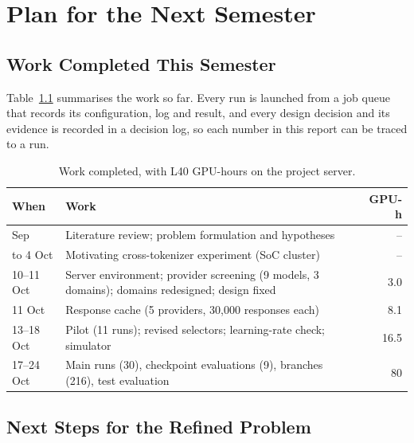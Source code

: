 \chapter{Plan for the Next Semester}
\label{ca:chap:plan}

\section{Work Completed This Semester}

Table~\ref{ca:tab:done} summarises the work so far. Every run is launched from a job queue
that records its configuration, log and result, and every design decision and its evidence
is recorded in a decision log, so each number in this report can be traced to a run.

\begin{table}[htbp]
\centering
\small
\begin{tabular}{@{}l>{\raggedright\arraybackslash}p{8.6cm}r@{}}
\toprule
\textbf{When} & \textbf{Work} & \textbf{GPU-h} \\
\midrule
Sep            & Literature review; problem formulation and hypotheses & -- \\
to 4 Oct       & Motivating cross-tokenizer experiment (SoC cluster) & -- \\
10--11 Oct     & Server environment; provider screening (9 models, 3 domains); domains redesigned; design fixed & 3.0 \\
11 Oct         & Response cache (5 providers, 30,000 responses each) & 8.1 \\
13--18 Oct     & Pilot (11 runs); revised selectors; learning-rate check; simulator & 16.5 \\
17--24 Oct     & Main runs (30), checkpoint evaluations (9), branches (216), test evaluation & 80 \\
\bottomrule
\end{tabular}
\caption{Work completed, with L40 GPU-hours on the project server.}
\label{ca:tab:done}
\end{table}

\section{Next Steps for the Refined Problem}
\label{ca:sec:next}

